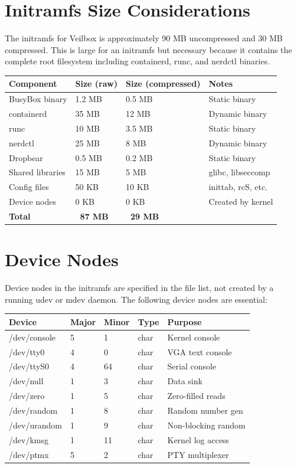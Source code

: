 \section{Initramfs Size Considerations}

The initramfs for Veilbox is approximately 90 MB uncompressed and 30 MB
compressed. This is large for an initramfs but necessary because it
contains the complete root filesystem including containerd, runc, and
nerdctl binaries.

\begin{longtable}{|p{4cm}|p{3cm}|p{3cm}|p{3cm}|}
\hline
\textbf{Component} & \textbf{Size (raw)} & \textbf{Size (compressed)} & \textbf{Notes} \\
\hline
BusyBox binary & 1.2 MB & 0.5 MB & Static binary \\
containerd & 35 MB & 12 MB & Dynamic binary \\
runc & 10 MB & 3.5 MB & Static binary \\
nerdctl & 25 MB & 8 MB & Dynamic binary \\
Dropbear & 0.5 MB & 0.2 MB & Static binary \\
Shared libraries & 15 MB & 5 MB & glibc, libseccomp \\
Config files & 50 KB & 10 KB & inittab, rcS, etc. \\
Device nodes & 0 KB & 0 KB & Created by kernel \\
\hline
\textbf{Total} & \textbf{~87 MB} & \textbf{~29 MB} & \\
\hline
\end{longtable}

\section{Device Nodes}

Device nodes in the initramfs are specified in the file list, not created
by a running udev or mdev daemon. The following device nodes are essential:

\begin{longtable}{|p{3cm}|p{2cm}|p{2cm}|p{2cm}|p{4cm}|}
\hline
\textbf{Device} & \textbf{Major} & \textbf{Minor} & \textbf{Type} & \textbf{Purpose} \\
\hline
/dev/console & 5 & 1 & char & Kernel console \\
/dev/tty0 & 4 & 0 & char & VGA text console \\
/dev/ttyS0 & 4 & 64 & char & Serial console \\
/dev/null & 1 & 3 & char & Data sink \\
/dev/zero & 1 & 5 & char & Zero-filled reads \\
/dev/random & 1 & 8 & char & Random number gen \\
/dev/urandom & 1 & 9 & char & Non-blocking random \\
/dev/kmsg & 1 & 11 & char & Kernel log access \\
/dev/ptmx & 5 & 2 & char & PTY multiplexer \\
\hline
\end{longtable}


